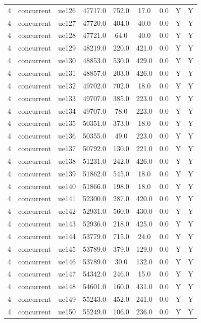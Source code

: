 \begin{table}[ht]
\begin{tabular}{|c|c|c|c|c|c|c|c|c|}
4 & concurrent & ue126 & 47717.0 & 752.0 & 17.0 & 0.0 & Y & Y \\
4 & concurrent & ue127 & 47720.0 & 404.0 & 40.0 & 0.0 & Y & Y \\
4 & concurrent & ue128 & 47721.0 & 64.0 & 40.0 & 0.0 & Y & Y \\
4 & concurrent & ue129 & 48219.0 & 220.0 & 421.0 & 0.0 & Y & Y \\
4 & concurrent & ue130 & 48853.0 & 530.0 & 429.0 & 0.0 & Y & Y \\
4 & concurrent & ue131 & 48857.0 & 203.0 & 426.0 & 0.0 & Y & Y \\
4 & concurrent & ue132 & 49702.0 & 702.0 & 18.0 & 0.0 & Y & Y \\
4 & concurrent & ue133 & 49707.0 & 385.0 & 223.0 & 0.0 & Y & Y \\
4 & concurrent & ue134 & 49707.0 & 78.0 & 223.0 & 0.0 & Y & Y \\
4 & concurrent & ue135 & 50351.0 & 373.0 & 18.0 & 0.0 & Y & Y \\
4 & concurrent & ue136 & 50355.0 & 49.0 & 223.0 & 0.0 & Y & Y \\
4 & concurrent & ue137 & 50792.0 & 130.0 & 221.0 & 0.0 & Y & Y \\
4 & concurrent & ue138 & 51231.0 & 242.0 & 426.0 & 0.0 & Y & Y \\
4 & concurrent & ue139 & 51862.0 & 545.0 & 18.0 & 0.0 & Y & Y \\
4 & concurrent & ue140 & 51866.0 & 198.0 & 18.0 & 0.0 & Y & Y \\
4 & concurrent & ue141 & 52300.0 & 287.0 & 420.0 & 0.0 & Y & Y \\
4 & concurrent & ue142 & 52931.0 & 560.0 & 430.0 & 0.0 & Y & Y \\
4 & concurrent & ue143 & 52936.0 & 218.0 & 425.0 & 0.0 & Y & Y \\
4 & concurrent & ue144 & 53779.0 & 715.0 & 24.0 & 0.0 & Y & Y \\
4 & concurrent & ue145 & 53789.0 & 379.0 & 129.0 & 0.0 & Y & Y \\
4 & concurrent & ue146 & 53789.0 & 30.0 & 132.0 & 0.0 & Y & Y \\
4 & concurrent & ue147 & 54342.0 & 246.0 & 15.0 & 0.0 & Y & Y \\
4 & concurrent & ue148 & 54601.0 & 160.0 & 431.0 & 0.0 & Y & Y \\
4 & concurrent & ue149 & 55243.0 & 452.0 & 241.0 & 0.0 & Y & Y \\
4 & concurrent & ue150 & 55249.0 & 106.0 & 236.0 & 0.0 & Y & Y \\

\end{tabular}
\end{table}
